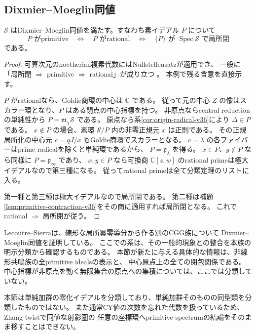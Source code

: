 \subsection{Dixmier--Moeglin同値}

\begin{corollary}
\label{cor:dme-v36}
$\mathcal S$ はDixmier--Moeglin同値を満たす。すなわち素イデアル $P$ について
\[
 P\text{ がprimitive}
 \quad\Longleftrightarrow\quad
 P\text{ がrational}
 \quad\Longleftrightarrow\quad
 \{P\}\text{ が }\operatorname{Spec}\mathcal S\text{ で局所閉}
\]
である。
\end{corollary}

\begin{proof}
可算次元のnoetherian複素代数にはNullstellensatzが適用でき、
一般に「局所閉 $\Rightarrow$ primitive $\Rightarrow$ rational」が成り立つ
\cite{BellWangYee2019}。
本例で残る含意を直接示す。

$P$ がrationalなら、Goldie商環の中心は $\mathbb C$ である。
従って元の中心 $Z$ の像はスカラー環となり、$P$ はある閉点の中心指標を持つ。
非原点ならcentral reductionの単純性から $P=\mathfrak m_\chi\mathcal S$ である。
原点なら系\ref{cor:origin-radical-v36}により $\Delta\in P$ である。
$x\notin P$ の場合、素環 $\mathcal S/P$ 内の非零正規元 $x$ は正則である。
その正規局所化の中心元 $c=qJ/x$ もGoldie商環でスカラーとなる。
$c=\lambda$ の各ファイバーはprime radicalを除くと単純環であるから、
$P=\mathfrak p_\lambda$ を得る。
$x\in P$、$y\notin P$ なら同様に $P=\mathfrak p_\infty$ であり、
$x,y\in P$ なら可換商 $\mathbb C[z,w]$ のrational primeは極大イデアルなので第三種になる。
従ってrational primeは全て分類定理のリストに入る。

第一種と第三種は極大イデアルなので局所閉である。
第二種は補題\ref{lem:primitive-contraction-v36}をその商に適用すれば局所閉となる。
これでrational $\Rightarrow$ 局所閉が従う。
\end{proof}

Lecoutre--Sierraは、線形な局所冪零導分から作る別のCGG族について
Dixmier--Moeglin同値を証明している\cite{LecoutreSierra2019}。
ここでの系は、その一般的現象との整合を本族の明示分類から確認するものである。
本節が新たに与える具体的な情報は、非線形共鳴族の全primitive idealsの表示と、
中心原点上の全ての閉包関係である。
中心指標が非原点を動く無限集合の原点への集積については、ここでは分類していない。

本節は単純加群の零化イデアルを分類しており、単純加群そのものの同型類を分類したものではない。
また通常CY値の次数を忘れた代数を扱っているため、Zhang twistで同値な射影圏の
任意の座標環へprimitive spectrumの結論をそのまま移すことはできない。
